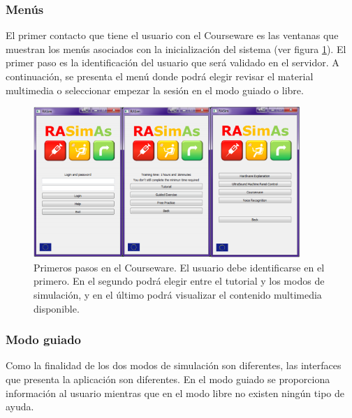 \subsubsection{Menús} 

El primer contacto que tiene el usuario con el \ac{Courseware} es las ventanas que muestran los menús asociados con la inicialización del sistema (ver figura \ref{fig:courseintro}). El primer paso es la identificación del usuario que será validado en el servidor. A continuación, se presenta el menú donde podrá elegir revisar el material multimedia o seleccionar empezar la sesión en el modo guiado o libre. %

\begin{figure}[h]
    \centering
    \includegraphics[width=0.9\textwidth]{IMG/coursewareintro.PNG}
    \caption{Primeros pasos en el \ac{Courseware}. El usuario debe identificarse en el primero. En el segundo podrá elegir entre el tutorial y los modos de simulación, y en el último podrá visualizar el contenido multimedia disponible.}
    \label{fig:courseintro}
\end{figure}

\subsubsection{Modo guiado}

Como la finalidad de los dos modos de simulación son diferentes, las interfaces que presenta la aplicación son diferentes. En el modo guiado se proporciona información al usuario mientras que en el modo libre no existen ningún tipo de ayuda.

